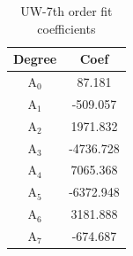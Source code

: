 \begin{table}[h]
  \centering
  \caption{UW-\water 7th order fit coefficients}
  \begin{tabular}{cc}
    \toprule
     Degree & Coef\\ 
    \midrule                                  
    A$_0$  &  87.181\\
    A$_1$  &  -509.057\\
    A$_2$  &  1971.832\\
    A$_3$  &  -4736.728\\
    A$_4$  &  7065.368\\
    A$_5$  &  -6372.948\\
    A$_6$  &  3181.888\\
    A$_7$  &  -674.687\\
  \end{tabular}
  \label{tab:un_h2o_fit_coeffs}
\end{table}
